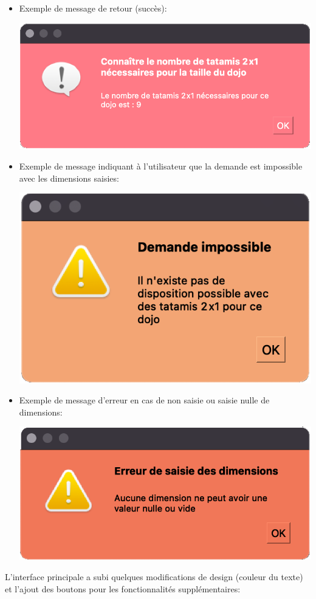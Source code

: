 \begin{itemize}


    \item Exemple de message de retour (succès):

          \begin{center}
              \includegraphics[scale=0.25]{images/prodRetourSucces.png}
          \end{center}


    \item Exemple de message indiquant à l’utilisateur que la demande est impossible avec les dimensions saisies:

          \begin{center}
              \includegraphics[scale=0.25]{images/prodImpossible.png}
          \end{center}


    \item Exemple de message d’erreur en cas de non saisie ou saisie nulle de dimensions:

          \begin{center}
              \includegraphics[scale=0.25]{images/prodErreurSaisie.png}
          \end{center}


\end{itemize}
L’interface principale a subi quelques modifications de design (couleur du texte) et l’ajout des boutons pour les
fonctionnalités supplémentaires:


